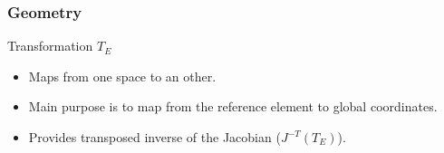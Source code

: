 \documentclass[ignorenonframetext,11pt]{beamer}
\theoremstyle{definition}
\begin{document}
\begin{frame}
  \frametitle{Geometry}

  Transformation $T_E$
  \begin{itemize}
  \item Maps from one space to an other.
  \item Main purpose is to map from the reference element to global coordinates.
  \item Provides transposed inverse of the Jacobian ($J^{-T}(T_E)$).
  \end{itemize}





\end{frame}
\end{document}
